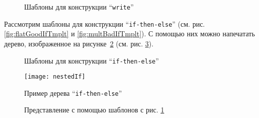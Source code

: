 \begin{figure}[h!]
	\null\hfill
	\subfloat[]{
		
		\label{fig:writeTmplt1}	
	}
	\hfill
	\subfloat[]{
		
		\label{fig:writeTmplt2}
	}
	\hfill
	\null

	\caption{Шаблоны для конструкции “\lstinline{write}”}
\end{figure}

Рассмотрим шаблоны для конструкции “\lstinline{if-then-else}” (см. рис. \ref{fig:flatGoodIfTmplt} и \ref{fig:multBadIfTmplt}).
С помощью них можно напечатать дерево, изображенное на рисунке~\ref{fig:nestedIf} (см. рис. \ref{fig:nestedIfCode}).

\begin{figure}[h!]
	\hfill
	
	
	\caption{Шаблоны для конструкции “\lstinline{if-then-else}”}
	\label{fig:ifTmplt}
\end{figure}

\begin{figure}[h!]
	\centering
	\texttt{[image: nestedIf]}
	\caption{Пример дерева “\lstinline{if-then-else}”}
	\label{fig:nestedIf}
\end{figure}

\begin{figure}[h!]
	\centering
	
	\caption{Представление с помощью шаблонов с рис. \ref{fig:ifTmplt}}
	\label{fig:nestedIfCode}
\end{figure}

